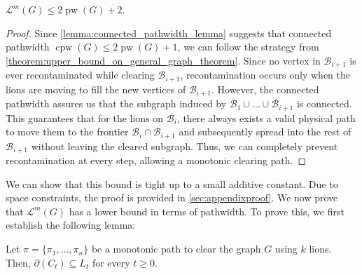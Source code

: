 \documentclass[a4paper,UKenglish,cleveref, autoref, thm-restate]{lipics-v2021}
\begin{document}
\begin{theorem}\label{theorem:monotonous_upper_bound_on_general_graph_theorem}
$\mathcal{L}^m(G) \leq 2\operatorname{pw}(G)+2$.
\end{theorem}

\begin{proof}
Since \cref{lemma:connected_pathwidth_lemma} suggests that connected pathwidth $\operatorname{cpw}(G) \leq 2\operatorname{pw}(G)+1$, we can follow the strategy from \cref{theorem:upper_bound_on_general_graph_theorem}. Since no vertex in $\mathcal{B}_{i+1}$ is ever recontaminated while clearing $\mathcal{B}_{i+1}$, recontamination occurs only when the lions are moving to fill the new vertices of $\mathcal{B}_{i+1}$. However, the connected pathwidth assures us that the subgraph induced by $\mathcal{B}_1 \cup \dots \cup \mathcal{B}_{i+1}$ is connected. This guarantees that for the lions on $\mathcal{B}_i$, there always exists a valid physical path to move them to the frontier $\mathcal{B}_i \cap \mathcal{B}_{i+1}$ and subsequently spread into the rest of $\mathcal{B}_{i+1}$ without leaving the cleared subgraph. Thus, we can completely prevent recontamination at every step, allowing a monotonic clearing path.
\end{proof}

We can show that this bound is tight up to a small additive constant. Due to space constraints, the proof is provided in \cref{sec:appendixproof}. We now prove that $\mathcal{L}^m(G)$ has a lower bound in terms of pathwidth. To prove this, we first establish the following lemma:

\begin{lemma}\label{lemma:boundary_keeping_lemma}
Let $\pi=\{\pi_1, \dots, \pi_n\}$ be a monotonic path to clear the graph $G$ using $k$ lions. Then, $\partial(C_t) \subseteq L_t$ for every $t \geq 0$.
\end{lemma}
\end{document}
